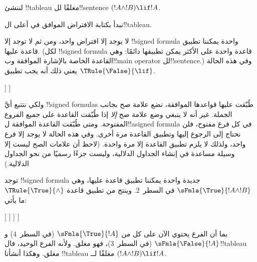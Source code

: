 \documentclass[../../../include/open-logic-section]{subfiles}
\begin{document}
      {}
      {}


\begin{ex}
لننشئ !!{tableau} مغلقًا لل!!{sentence} $(!A \land !B) \lif !A$.

نبدأ بكتابة الافتراض الموافق في أعلى ال!!{tableau}.
\begin{oltableau}
  [\sFmla{\False}{(\formula{A} \land \formula{B}) \lif \formula{A}},
    just = \TAss]
\end{oltableau}

لا يوجد إلا افتراض واحد، ومن ثم لا توجد إلا !!{signed formula} واحدة
يمكننا تطبيق قاعدة عليها. (لكل !!{signed formula} قاعدة واحدة على الأكثر
يمكن تطبيقها دائمًا: وهي القاعدة الخاصة بالإشارة الموافقة وب!!{main operator}
لل!!{sentence}.) وفي هذه الحالة يعني ذلك أنه يجب تطبيق $\TRule{\False}{\lif}$.
\begin{oltableau}
  [\sFmla{\False}{(\formula{A} \land \formula{B}) \lif \formula{A}},
    checked, just = \TAss
    [\sFmla{\True}{\formula{A} \land \formula{B}},
      just={\TRule{\False}{\lif}[1]}
      [\sFmla{\False}{\formula{A}}, just={\TRule{\False}{\lif}[1]}]
    ]
  ]
\end{oltableau}
ولكي نتتبع أيَّ !!{signed formula}s طُبّقت عليها قواعدها الموافقة، نضع علامة
صح بجانب الجملة. غير أنه لا ينبغي وضع علامة صح \emph{إلا} إذا طُبّقت القاعدة
على جميع الفروع المفتوحة. ومتى طُبّقت القاعدة الموافقة ل!!a{signed formula}
في كل فرع مفتوح، فلن نحتاج إلى الرجوع إليها وتطبيق القاعدة مرة أخرى. وفي هذه
الحالة لا يوجد إلا فرع واحد، ولذلك لا يلزم تطبيق القاعدة إلا مرة واحدة. (لاحظ
أن علامات الصح ليست إلا وسيلة مساعدة في إنشاء الجداول الدلالية، وليست جزءًا
رسميًا من نحو الجداول الدلالية.)

توجد !!{signed formula} جديدة واحدة يمكننا تطبيق قاعدة عليها، وهي
$\sFmla{\True}{!A \land !B}$ في السطر~$2$. وينتج من تطبيق قاعدة
$\TRule{\True}{\land}$ ما يأتي:
\begin{oltableau}
  [\sFmla{\False}{(\formula{A} \land \formula{B}) \lif \formula{A}},
    checked, just = \TAss
    [\sFmla{\True}{\formula{A} \land \formula{B}},
      just={\TRule{\False}{\lif}[1]}, checked
      [\sFmla{\False}{\formula{A}}, just={\TRule{\False}{\lif}[1]}
        [\sFmla{\True}{\formula{A}}, just={\TRule{\True}{\land}[2]}
          [\sFmla{\True}{\formula{B}}, just={\TRule{\True}{\land}[2]}, close
          ]
        ]
      ]
    ]
  ]
\end{oltableau}
بما أن الفرع يحتوي الآن على كل من $\sFmla{\True}{!A}$ (في السطر~$4$)
و$\sFmla{\False}{!A}$ (في السطر~$3$)، فهو مغلق. ولأنه الفرع الوحيد،
فال!!{tableau} مغلق. وهكذا أنشأنا !!{tableau} مغلقًا لــ
$(!A \land !B) \lif !A$.
\end{ex}
\end{document}
